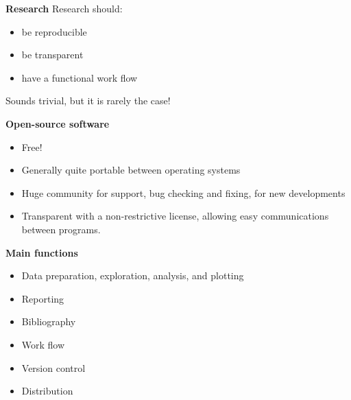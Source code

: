 \documentclass[9pt,xcolor=pdftex,dvipsnames,table]{beamer}
\begin{document}
\begin{frame}{\textbf{Research}}
Research should:
\begin{itemize}
\item be reproducible
\item be transparent
\item have a functional work flow
\end{itemize}
\vspace{0.6cm}
Sounds trivial, but it is rarely the case!
\vspace{-0.5cm}
\end{frame}


\begin{frame}{\textbf{Open-source software}}
\begin{itemize}
\item Free!
\item Generally quite portable between operating systems
\item Huge community for support, bug checking and fixing, for new developments
\item Transparent with a non-restrictive license, allowing easy
  communications between programs.
\end{itemize}
\end{frame}


\begin{frame}{\textbf{Main functions}}
\begin{itemize}
\item Data preparation, exploration, analysis, and plotting
\item Reporting
\item Bibliography
\item Work flow
\item Version control
\item Distribution
\end{itemize}
\end{frame}
\end{document}
